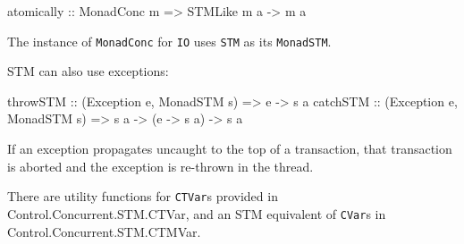 \begin{haskellcode}
atomically :: MonadConc m => STMLike m a -> m a
\end{haskellcode}

The instance of \verb|MonadConc| for \verb|IO| uses \verb|STM| as its
\verb|MonadSTM|.

STM can also use exceptions:

\begin{haskellcode}
throwSTM :: (Exception e, MonadSTM s) => e -> s a
catchSTM :: (Exception e, MonadSTM s) => s a -> (e -> s a) -> s a
\end{haskellcode}

If an exception propagates uncaught to the top of a transaction, that
transaction is aborted and the exception is re-thrown in the thread.

There are utility functions for \verb|CTVar|s provided in
Control\-.Concurrent\-.STM\-.CTVar, and an STM equivalent of
\verb|CVar|s in Control\-.Concurrent\-.STM\-.CTMVar.
